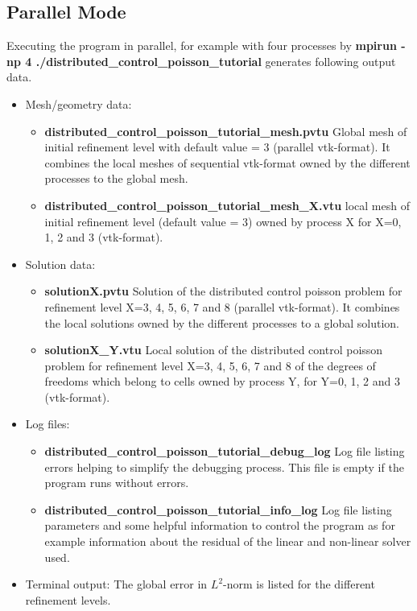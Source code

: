 \documentclass[a4paper, 11pt, twoside]{article}
\begin{document}
\subsection{Parallel Mode} 
Executing the program in parallel, for example with four processes by \textbf{mpirun -np 4 ./distributed\_control\_poisson\_tutorial}   
generates following output data. 
\begin{itemize}
\item Mesh/geometry data:
\begin{itemize}
\item \textbf{distributed\_control\_poisson\_tutorial\_mesh.pvtu} Global mesh of initial refinement level with default value = 3 (parallel vtk-format). It combines the local meshes of sequential vtk-format owned by the different processes to the global mesh.
\item \textbf{distributed\_control\_poisson\_tutorial\_mesh\_X.vtu} local mesh of initial refinement level (default value = 3) owned by process X for X=0, 1, 2 and 3 (vtk-format).
\end{itemize}
\item Solution data:
\begin{itemize}
\item \textbf{solutionX.pvtu} Solution of the distributed control poisson problem for refinement level X=3, 4, 5, 6, 7 and 8  (parallel vtk-format). It combines the local solutions owned by the different processes to a global solution.
\item \textbf{solutionX\_Y.vtu} Local solution of the distributed control poisson problem for refinement level X=3, 4, 5, 6, 7 and 8 of the degrees of freedoms which belong to cells owned by process Y, for Y=0, 1, 2 and 3 (vtk-format).
\end{itemize}
\item Log files:
\begin{itemize}
\item \textbf{distributed\_control\_poisson\_tutorial\_debug\_log} Log file listing errors helping to simplify the debugging process. This file is empty if the program runs without errors.
\item \textbf{distributed\_control\_poisson\_tutorial\_info\_log} Log file listing parameters and some helpful information to control 
      the program as for example information about the residual of the linear and non-linear solver used.
\end{itemize}
\item Terminal output: The global error in $L^2$-norm is listed for the different refinement levels. 
\end{itemize}
\end{document}

